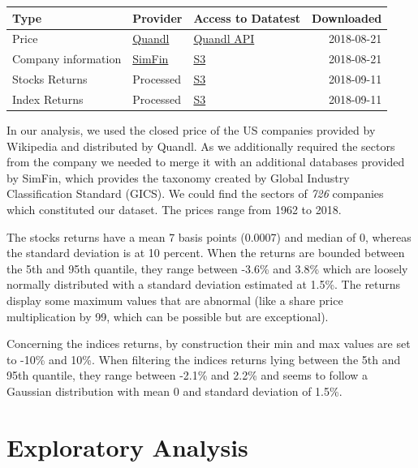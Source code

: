 \documentclass[a4paper,twoside]{article}
\begin{document}
\begin{center}
\begin{tabular}{lllr}
Type & Provider & Access to Datatest & Downloaded\\
\hline
Price & \href{https://www.quandl.com/databases/WIKIP/documentation/about}{Quandl} & \href{https://www.quandl.com/databases/WIKIP}{Quandl API} & 2018-08-21\\
Company information & \href{https://simfin.com/data/find/}{SimFin} & \href{https://s3.us-east-2.amazonaws.com/udacity-capstone-data-davidpham87/data/company\_fundamentals.csv}{S3} & 2018-08-21\\
Stocks Returns & Processed & \href{https://s3.us-east-2.amazonaws.com/udacity-capstone-data-davidpham87/data/wiki\_stocks\_returns.csv}{S3} & 2018-09-11\\
Index Returns & Processed & \href{https://s3.us-east-2.amazonaws.com/udacity-capstone-data-davidpham87/data/wiki\_indices\_returns.csv}{S3} & 2018-09-11\\
\hline
\end{tabular}
\end{center}

In our analysis, we used the closed price of the US companies provided by
Wikipedia and distributed by Quandl. As we additionally required the sectors
from the company we needed to merge it with an additional databases provided by
SimFin, which provides the taxonomy created by Global Industry Classification
Standard (GICS). We could find the sectors of \emph{726} companies which
constituted our dataset. The prices range from 1962 to 2018.

The stocks returns have a mean 7 basis points (0.0007) and median of 0, whereas
the standard deviation is at 10 percent. When the returns are bounded between
the 5th and 95th quantile, they range between -3.6\% and 3.8\% which are loosely
normally distributed with a standard deviation estimated at 1.5\%. The returns
display some maximum values that are abnormal (like a share price multiplication
by 99, which can be possible but are exceptional).

Concerning the indices returns, by construction their min and max values are set
to -10\% and 10\%. When filtering the indices returns lying between the 5th and
95th quantile, they range between -2.1\% and 2.2\% and seems to follow a Gaussian
distribution with mean 0 and standard deviation of 1.5\%.

\section{Exploratory Analysis}
\label{sec:org89bc8d0}
\end{document}

